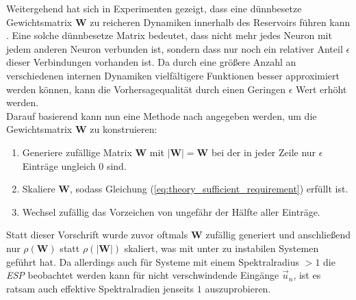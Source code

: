 Weitergehend hat sich in Experimenten gezeigt, dass eine dünnbesetze Gewichtsmatrix $\mathbf{W}$ zu reicheren Dynamiken innerhalb des Reservoirs führen kann \citep{jaeger2010}. Eine solche dünnbesetze Matrix bedeutet, dass nicht mehr jedes Neuron mit jedem anderen Neuron verbunden ist, sondern dass nur noch ein relativer Anteil $\epsilon$ dieser Verbindungen vorhanden ist. Da durch eine größere Anzahl an verschiedenen internen Dynamiken vielfältigere Funktionen besser approximiert werden können, kann die Vorhersagequalität durch einen Geringen $\epsilon$ Wert erhöht werden.\\

Darauf basierend kann nun eine Methode nach \cite{yildiz} angegeben werden, um die Gewichtsmatrix $\mathbf{W}$ zu konstruieren:

\singlespacing
\begin{enumerate}
	\item Generiere zufällige Matrix $\mathbf{W}$ mit $\mathbf{|W|} = \mathbf{W}$ bei der in jeder Zeile nur $\epsilon$ Einträge ungleich $0$ sind.
	\item Skaliere $\mathbf{W}$, sodass Gleichung (\ref{eq:theory_sufficient_requirement}) erfüllt ist.
	\item Wechsel zufällig das Vorzeichen von ungefähr der Hälfte aller Einträge.
\end{enumerate}
\onehalfspacing

Statt dieser Vorschrift wurde zuvor oftmals $\mathbf{W}$ zufällig generiert und anschließend nur $\rho(\mathbf{W})$ statt $\rho(|\mathbf{W}|)$ skaliert, was mit unter zu instabilen Systemen geführt hat. Da allerdings auch für Systeme mit einem Spektralradius $ > 1$ die \textit{ESP} beobachtet werden kann für nicht verschwindende Eingänge $\vec{u}_n$, ist es ratsam auch effektive Spektralradien jenseits $1$ auszuprobieren.